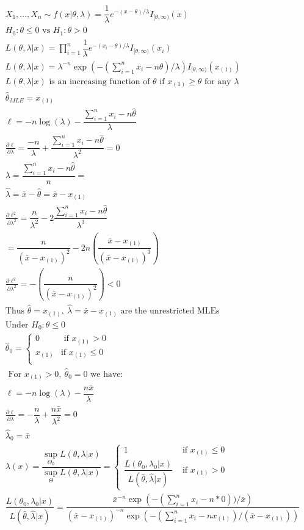 \documentclass{article}
\newcommand{\pderiv}[2]{\frac{\partial #1}{\partial #2}}
\newcommand{\lm}{\lambda}
\newcommand{\hth}{\hat{\theta}}
\newcommand{\prodn}{\prod_{i=1}^{n}}
\newcommand{\mle}{\hat{\theta}_{MLE}}
\newcommand{\sumx}{\sum_{i=1}^{n}x_i}
\newcommand{\ta}{\theta}
\newcommand{\lx}{\lambda(x)}
\newcommand{\samp}{X_1,\dots,X_n \sim}
\newcommand{\xm}{x_{(1)}}
\begin{document}
\begin{flushleft}
\begin{multline*}\\
\samp f(x|\ta,\lambda)=\dfrac{1}{\lambda}e^{-(x-\ta)/\lambda}I_{[\ta,\infty)}(x)\\
H_0: \ta \leq 0 \text{ vs } H_1:\ta >0\\
L(\ta,\lm|x)=\prodn \dfrac{1}{\lambda}e^{-(x_i-\ta)/\lambda}I_{[\ta,\infty)}(x_i)\\
L(\ta,\lm|x)=\lm^{-n}\exp\left(-(\sumx-n\ta)/\lm \right)I_{[\ta,\infty)}(x_{(1)})\\
L(\ta,\lm|x) \text{ is an increasing function of } \ta\text{ if } \xm \geq \ta  \text{ for any } \lm\\
\mle=\xm\\
\ell=-n\log(\lm)-\dfrac{\sumx-n\hth}{\lm}\\
\pderiv{\ell}{\lm}=\dfrac{-n}{\lm}+\dfrac{\sumx-n\hth}{\lm^2}=0\\
\lm=\dfrac{\sumx-n\hth}{n}=\\
\hat{\lm}=\bar{x}-\hth=\bar{x}-\xm\\
\pderiv{\ell^2}{\lm^2}=\dfrac{n}{\lm^2}-2\dfrac{\sumx-n\hth}{\lm^3}\\
=\dfrac{n}{(\bar{x}-\xm)^2}-2n\left(\dfrac{\bar{x}-\xm}{(\bar{x}-\xm)^3}\right)\\
\pderiv{\ell^2}{\lm^2}=-\left(\dfrac{n}{(\bar{x}-\xm)^2}\right)<0\\
\text{Thus } \hth=\xm, \ \hat{\lm}=\bar{x}-\xm \text{ are the unrestricted MLEs}\\
\text{Under } H_0: \ta\leq 0\\
\hth_0=\begin{cases}
0 & \text{ if } \xm >0\\
\xm & \text{if } \xm \leq 0\\
\end{cases}\\
\text{ For } \xm>0, \ \hth_0=0 \text{ we have:}\\
\ell=-n\log(\lm)-\dfrac{n\bar{x}}{\lm}\\
\pderiv{\ell}{\lm}=-\dfrac{n}{\lm}+\dfrac{n\bar{x}}{\lm^2}=0\\
\hat{\lm}_0=\bar{x}\\
\lx=\dfrac{\sup_{\Theta_0}L(\ta,\lm|x)}{\sup_{\Theta}L(\ta,\lm|x)}=\begin{cases}
1 & \text{ if } \xm\leq 0\\
 \dfrac{L(\ta_0,\lm_0|x)}{L(\hth,\hat{\lm}|x)} & \text{ if } \xm> 0
\end{cases}\\
 \dfrac{L(\ta_0,\lm_0|x)}{L(\hth,\hat{\lm}|x)}=\dfrac{\bar{x}^{-n}\exp\left(-(\sumx-n*0))/\bar{x} \right)}{(\bar{x}-\xm)^{-n}\exp\left(-(\sumx-n\xm)/(\bar{x}-\xm) \right)}\\

\end{multline*}
\end{flushleft}
\end{document}

